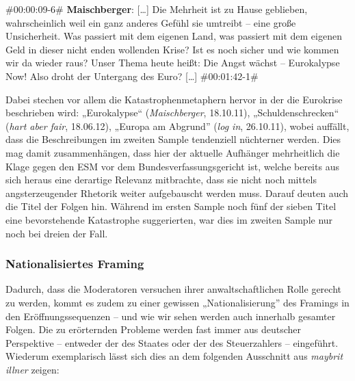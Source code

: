 \begin{description}
	\begin{linenumbers}[1]
		\item \#00:00:09-6\# \textbf{Maischberger}: [\ldots] Die Mehrheit ist zu Hause geblieben, wahrscheinlich weil ein ganz anderes Gefühl sie umtreibt – eine große Unsicherheit. Was passiert mit dem eigenen Land, was passiert mit dem eigenen Geld in dieser nicht enden wollenden Krise? Ist es noch sicher und wie kommen wir da wieder raus? Unser Thema heute heißt: Die Angst wächst – Eurokalypse Now! Also droht der Untergang des Euro? [\ldots] \#00:01:42-1\# 
	\end{linenumbers}
\end{description}

Dabei stechen vor allem die Katastrophenmetaphern hervor in der die Eurokrise beschrieben wird: „Eurokalypse“ (\textit{Maischberger}, 18.10.11), „Schuldenschrecken“ (\textit{hart aber fair}, 18.06.12), „Europa am Abgrund” (\textit{log in}, 26.10.11), wobei auffällt, dass die Beschreibungen im zweiten Sample tendenziell nüchterner werden. Dies mag damit zusammenhängen, dass hier der aktuelle Aufhänger mehrheitlich die Klage gegen den ESM vor dem Bundesverfassungsgericht ist, welche bereits aus sich heraus eine derartige Relevanz mitbrachte, dass sie nicht noch mittels angsterzeugender Rhetorik weiter aufgebauscht werden muss. Darauf deuten auch die Titel der Folgen hin. Während im ersten Sample noch fünf der sieben Titel eine bevorstehende Katastrophe suggerierten, war dies im zweiten Sample nur noch bei dreien der Fall.

\subsubsection{Nationalisiertes Framing}

Dadurch, dass die Moderatoren versuchen ihrer anwaltschaftlichen Rolle gerecht zu werden, kommt es zudem zu einer gewissen „Nationalisierung” des Framings in den Eröffnungssequenzen – und wie wir sehen werden auch innerhalb gesamter Folgen. Die zu erörternden Probleme werden fast immer aus deutscher Perspektive – entweder der des Staates oder der des Steuerzahlers – eingeführt. Wiederum exemplarisch lässt sich dies an dem folgenden Ausschnitt aus \textit{maybrit illner} zeigen:

